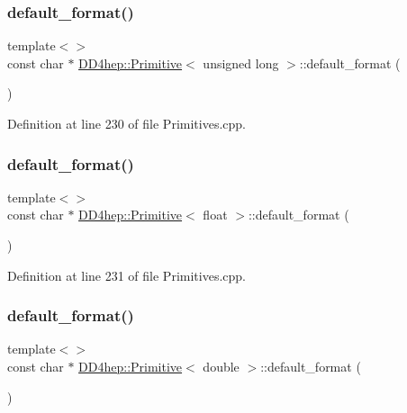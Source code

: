 \subsubsection{\texorpdfstring{default\+\_\+format()}{default\_format()}\hspace{0.1cm}{\footnotesize\ttfamily [10/15]}}
{\footnotesize\ttfamily template$<$$>$ \\
const char $\ast$ \hyperlink{struct_d_d4hep_1_1_primitive}{D\+D4hep\+::\+Primitive}$<$ unsigned long $>$\+::default\+\_\+format (\begin{DoxyParamCaption}{ }\end{DoxyParamCaption})}



Definition at line 230 of file Primitives.\+cpp.

\hypertarget{struct_d_d4hep_1_1_primitive_a0ec0e3359325f48afd85d62fe8377f88}{}\label{struct_d_d4hep_1_1_primitive_a0ec0e3359325f48afd85d62fe8377f88} 
\subsubsection{\texorpdfstring{default\+\_\+format()}{default\_format()}\hspace{0.1cm}{\footnotesize\ttfamily [11/15]}}
{\footnotesize\ttfamily template$<$$>$ \\
const char $\ast$ \hyperlink{struct_d_d4hep_1_1_primitive}{D\+D4hep\+::\+Primitive}$<$ float $>$\+::default\+\_\+format (\begin{DoxyParamCaption}{ }\end{DoxyParamCaption})}



Definition at line 231 of file Primitives.\+cpp.

\hypertarget{struct_d_d4hep_1_1_primitive_a153f4b4817a67be6de6ab05761558fda}{}\label{struct_d_d4hep_1_1_primitive_a153f4b4817a67be6de6ab05761558fda} 
\subsubsection{\texorpdfstring{default\+\_\+format()}{default\_format()}\hspace{0.1cm}{\footnotesize\ttfamily [12/15]}}
{\footnotesize\ttfamily template$<$$>$ \\
const char $\ast$ \hyperlink{struct_d_d4hep_1_1_primitive}{D\+D4hep\+::\+Primitive}$<$ double $>$\+::default\+\_\+format (\begin{DoxyParamCaption}{ }\end{DoxyParamCaption})}



